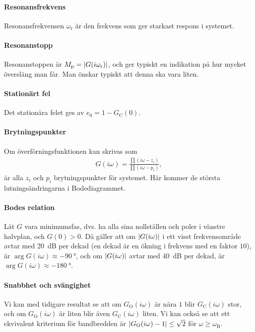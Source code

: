 \paragraph{Resonansfrekvens}
Resonansfrekvensen $\omega_{\text{r}}$ är den frekvens som ger starkast respons i systemet.

\paragraph{Resonanstopp}
Resonanstoppen är $M_{\text{p}} = \abs{G(i\omega_{\text{r}})}$, och ger typiskt en indikation på hur mycket översläng man får. Man önskar typiskt att denna ska vara liten.

\paragraph{Stationärt fel}
Det stationära felet ges av $e_{0} = 1 - G_{\text{C}}(0)$.

\paragraph{Brytningspunkter}
Om överförningsfunktionen kan skrivas som
\begin{align*}
	G(i\omega) = \frac{\prod(i\omega - z_{i})}{\prod(i\omega - p_{i})},
\end{align*}
är alla $z_{i}$ och $p_{i}$ brytningspunkter för systemet. Här kommer de största lutningsändringarna i Bodediagrammet.

\paragraph{Bodes relation}
Låt $G$ vara minimumsfas, dvs. ha alla sina nollställen och poler i vänstre halvplan, och $G(0) > 0$. Då gäller att om $\abs{G(i\omega)}$ i ett visst frekvensområde avtar med \SI{20}{\deci\bel} per dekad (en dekad är en ökning i frekvens med en faktor $10$), är $\arg{G(i\omega)}\approx \SI{-90}{\degree}$, och om $\abs{G(i\omega)}$ avtar med \SI{40}{\deci\bel} per dekad, är $\arg{G(i\omega)}\approx \SI{-180}{\degree}$.

\paragraph{Snabbhet och svängighet}
Vi kan med tidigare resultat se att om $G_{\text{O}}(i\omega)$ är nära $1$ blir $G_{\text{C}}(i\omega)$ stor, och om $G_{\text{O}}(i\omega)$ är liten blir även $G_{\text{C}}(i\omega)$ liten. Vi kan också se att ett ekvivalent kriterium för bandbredden är $\abs{G_{\text{O}}(i\omega) - 1} \leq \sqrt{2}$ för $\omega \geq \omega_{\text{B}}$.

